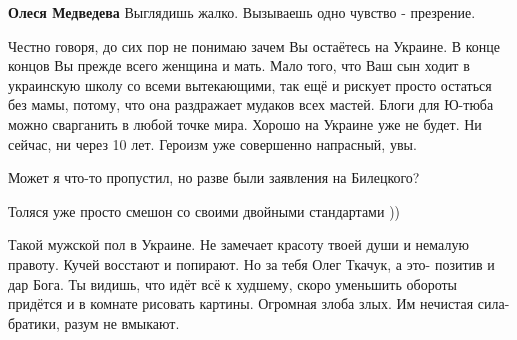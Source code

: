 \begin{itemize}
\begin{itemize}
 
\textbf{Олеся Медведева} Выглядишь жалко. Вызываешь одно чувство - презрение.

\end{itemize}


Честно говоря, до сих пор не понимаю зачем Вы остаётесь на Украине. В конце
концов Вы прежде всего женщина и мать. Мало того, что Ваш сын ходит в
украинскую школу со всеми вытекающими, так ещё и рискует просто остаться без
мамы, потому, что она раздражает мудаков всех мастей. Блоги для Ю-тюба можно
сварганить в любой точке мира. Хорошо на Украине уже не будет. Ни сейчас, ни
через 10 лет. Героизм уже совершенно напрасный, увы.


 
Может я что-то пропустил, но разве были заявления на Билецкого?

 
Толяся уже просто смешон со своими двойными стандартами ))

 

Такой мужской пол в Украине. Не замечает красоту твоей души и немалую правоту.
Кучей восстают и попирают. Но за тебя Олег Ткачук, а это- позитив и дар Бога.
Ты видишь, что идёт всё к худшему, скоро уменьшить обороты придётся и в комнате
рисовать картины. Огромная злоба злых. Им нечистая сила- братики, разум не
вмыкают.


 


\end{itemize}
